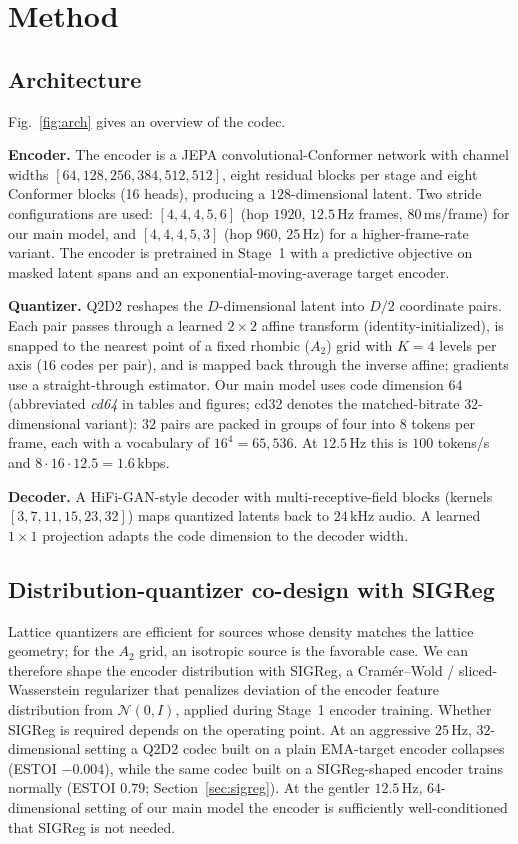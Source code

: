 \documentclass[conference,a4paper]{APSIPA2026}
\begin{document}
\section{Method}

\subsection{Architecture}

Fig.~\ref{fig:arch} gives an overview of the codec.

\textbf{Encoder.} The encoder is a JEPA convolutional-Conformer network with
channel widths $[64,128,256,384,512,512]$, eight residual blocks per stage and
eight Conformer blocks (16 heads), producing a $128$-dimensional latent. Two
stride configurations are used: $[4,4,4,5,6]$ (hop $1920$, $12.5$\,Hz frames,
$80$\,ms/frame) for our main model, and $[4,4,4,5,3]$ (hop $960$, $25$\,Hz)
for a higher-frame-rate variant. The encoder is pretrained in Stage~1 with a
predictive objective on masked latent spans and an exponential-moving-average
target encoder.

\textbf{Quantizer.} Q2D2 \cite{q2d2} reshapes the $D$-dimensional latent into
$D/2$ coordinate pairs. Each pair passes through a learned $2\times2$ affine
transform (identity-initialized), is snapped to the nearest point of a fixed
rhombic ($A_2$) grid with $K{=}4$ levels per axis ($16$ codes per pair), and is
mapped back through the inverse affine; gradients use a straight-through
estimator. Our main model uses code dimension $64$ (abbreviated \emph{cd64} in
tables and figures; cd32 denotes the matched-bitrate $32$-dimensional variant):
$32$ pairs are packed in groups of four into $8$ tokens per frame, each with a
vocabulary of $16^{4}=65{,}536$. At $12.5$\,Hz this is $100$ tokens/s and
$8\cdot16\cdot12.5 = 1.6$\,kbps.

\textbf{Decoder.} A HiFi-GAN-style decoder with multi-receptive-field blocks
(kernels $[3,7,11,15,23,32]$) maps quantized latents back to $24$\,kHz audio.
A learned $1\times1$ projection adapts the code dimension to the decoder width.

\subsection{Distribution-quantizer co-design with SIGReg}

Lattice quantizers are efficient for sources whose density matches the lattice
geometry; for the $A_2$ grid, an isotropic source is the favorable case. We can
therefore shape the encoder distribution with SIGReg, a Cram\'er--Wold /
sliced-Wasserstein regularizer that penalizes deviation of the encoder feature
distribution from $\mathcal{N}(0,I)$, applied during Stage~1 encoder training.
Whether SIGReg is required depends on the operating point. At an aggressive
$25$\,Hz, $32$-dimensional setting a Q2D2 codec built on a plain EMA-target
encoder collapses (ESTOI $-0.004$), while the same codec built on a
SIGReg-shaped encoder trains normally (ESTOI $0.79$; Section~\ref{sec:sigreg}).
At the gentler $12.5$\,Hz, $64$-dimensional setting of our main model the
encoder is sufficiently well-conditioned that SIGReg is not needed.
\end{document}
